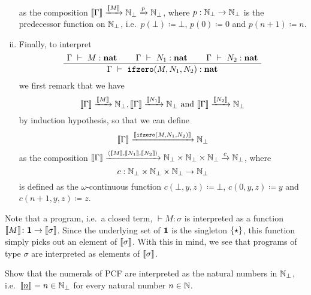 \begin{definition}
\begin{enumerate}[(i)]
\[    \]
    as the composition
    \(\llbracket\Gamma\rrbracket \xrightarrow{\llbracket M\rrbracket} \mathbb N_\bot \xrightarrow{p}
    \mathbb N_\bot\), where \(p : \mathbb N_\bot \to \mathbb N_\bot\) is the predecessor
    function on \(\mathbb N_\bot\), i.e.\ \(p(\bot) \coloneqq \bot\),
    \(p(0) \coloneqq 0\) and \(p(n+1) \coloneqq n\).
  \item
    Finally, to interpret
    \[
      \def\fCenter{\ \vdash\ }
      \Axiom$\Gamma \fCenter M : \pcfnat$
      \Axiom$\Gamma \fCenter N_1 : \pcfnat$
      \Axiom$\Gamma \fCenter N_2 : \pcfnat$
      \TrinaryInf$\Gamma \fCenter \pcfifz(M,N_1,N_2) : \pcfnat$
      \DisplayProof
    \]
    we first remark that we have
    \[
      \llbracket\Gamma\rrbracket \xrightarrow{\llbracket M\rrbracket} \mathbb N_\bot,
      \llbracket\Gamma\rrbracket \xrightarrow{\llbracket N_1\rrbracket} \mathbb N_\bot \text{ and }
      \llbracket\Gamma\rrbracket \xrightarrow{\llbracket N_2\rrbracket} \mathbb N_\bot
    \]
    by induction hypothesis, so that we can define
    \[
      \llbracket\Gamma\rrbracket \xrightarrow{\llbracket\operatorname{\mathtt{ifzero}}(M,N_1,N_2)\rrbracket} \mathbb N_\bot
    \]
    as the composition
    \(\llbracket\Gamma\rrbracket
    \xrightarrow{\langle{\llbracket M\rrbracket,\llbracket N_1\rrbracket,\llbracket N_2\rrbracket}\rangle}
    {{\mathbb N_\bot} \times {\mathbb N_\bot} \times {\mathbb N_\bot}} \xrightarrow{c}
    \mathbb N_\bot\), where
    \[
      c : \mathbb N_\bot \times \mathbb N_\bot \times \mathbb N_\bot \to \mathbb N_\bot
    \] is defined as the \(\omega\)-continuous function
    \(c(\bot,y,z) \coloneqq \bot\), \(c(0,y,z) \coloneqq y\) and
    \(c(n+1,y,z) \coloneqq z\).
  \end{enumerate}
\end{definition}

\begin{remark}
  Note that a program, i.e.\ a closed term, \({} \vdash M : \sigma\) is
  interpreted as a function
  \(\llbracket M\rrbracket \colon \mathbf 1 \to \llbracket\sigma\rrbracket\).
  Since the underlying set of \(\mathbf 1\) is the singleton \(\{\star\}\), this
  function simply picks out an element of \(\llbracket\sigma\rrbracket\).
  With this in mind, we see that programs of type \(\sigma\) are interpreted
  as elements of \(\llbracket\sigma\rrbracket\).
\end{remark}


\begin{exercise}\label{exer:interpretation-of-numerals}
  Show that the numerals of PCF are interpreted as the natural numbers in
  \(\mathbb N_\bot\), i.e.\ \(\llbracket\underline{n}\rrbracket = n \in \mathbb N_\bot\) for every
  natural number \(n \in \mathbb N\).
\end{exercise}

